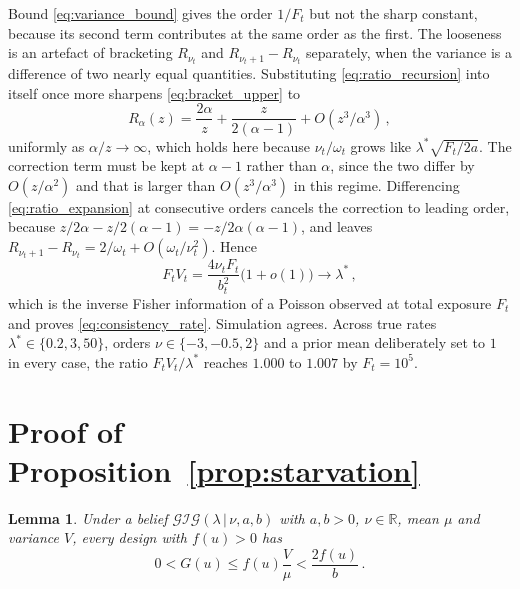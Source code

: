 \documentclass[twoside]{article}
\newcommand\given[1][]{\,#1\vert\,}
\providecommand{\Gig}{\mathcal{GIG}}  %
\theoremstyle{plain}
\newtheorem{lemma}{Lemma}
\theoremstyle{definition}
\theoremstyle{remark}
\begin{document}
Bound \eqref{eq:variance_bound} gives the order $1/F_t$ but not the sharp constant, because its second term contributes at the same order as the first.
The looseness is an artefact of bracketing $R_{\nu_t}$ and $R_{\nu_t + 1} - R_{\nu_t}$ separately, when the variance is a difference of two nearly equal quantities.
Substituting \eqref{eq:ratio_recursion} into itself once more sharpens \eqref{eq:bracket_upper} to
%
\begin{equation}
    R_{\alpha}(z) = \frac{2\alpha}{z} + \frac{z}{2(\alpha - 1)} + O(z^{3}/\alpha^{3}) \,,
    \label{eq:ratio_expansion}
\end{equation}
%
uniformly as $\alpha / z \to \infty$, which holds here because $\nu_t / \omega_t$ grows like $\lambda^{*} \sqrt{F_t / 2a}$.
The correction term must be kept at $\alpha - 1$ rather than $\alpha$, since the two differ by $O(z/\alpha^{2})$ and that is larger than $O(z^{3}/\alpha^{3})$ in this regime.
Differencing \eqref{eq:ratio_expansion} at consecutive orders cancels the correction to leading order, because $z/2\alpha - z/2(\alpha - 1) = -z / 2\alpha(\alpha - 1)$, and leaves $R_{\nu_t + 1} - R_{\nu_t} = 2/\omega_t + O(\omega_t / \nu_t^{2})$.
Hence
%
\begin{equation}
    F_t V_t = \frac{4 \nu_t F_t}{b_t^{2}} \big( 1 + o(1) \big) \longrightarrow \lambda^{*} \,,
    \label{eq:variance_rate}
\end{equation}
%
which is the inverse Fisher information of a Poisson observed at total exposure $F_t$ and proves \eqref{eq:consistency_rate}.
Simulation agrees.
Across true rates $\lambda^{*} \in \{0.2, 3, 50\}$, orders $\nu \in \{-3, -0.5, 2\}$ and a prior mean deliberately set to $1$ in every case, the ratio $F_t V_t / \lambda^{*}$ reaches $1.000$ to $1.007$ by $F_t = 10^{5}$.

\section{Proof of Proposition~\ref{prop:starvation}}
\label{appx:starvation}

\begin{lemma}
    \label{lem:eig_bound}
    Under a belief $\Gig(\lambda \given \nu, a, b)$ with $a, b > 0$, $\nu \in \mathbb{R}$, mean $\mu$ and variance $V$, every design with $f(u) > 0$ has
    \begin{equation}
        0 < G(u) \leq f(u) \frac{V}{\mu} < \frac{2 f(u)}{b} \,.
        \label{eq:eig_bound}
    \end{equation}
\end{lemma}
\end{document}
